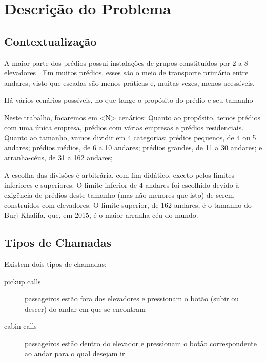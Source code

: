 \chapter{\label{chap:problem}Descrição do Problema}

\section{Contextualização}

A maior parte dos prédios possui instalações de grupos constituídos por 2 a 8
elevadores \cite{KOEHLEROTTIGER02}. Em muitos prédios, esses são o meio de
transporte primário entre andares, visto que escadas são menos práticas e,
muitas vezes, menos acessíveis. %

Há vários cenários possíveis, no que tange o propósito do prédio e seu tamanho

Neste trabalho, focaremos em <N> cenários: Quanto ao propósito, temos prédios
com uma única empresa, prédios com várias empresas e prédios residenciais.
Quanto ao tamanho, vamos dividir em 4 categorias: prédios pequenos, de 4 ou 5
andares; prédios médios, de 6 a 10 andares; prédios grandes, de 11 a 30 andares;
e arranha-céus, de 31 a 162 andares;



A escolha das divisões é arbitrária, com fim didático, exceto pelos limites
inferiores e superiores. O limite inferior de 4 andares foi escolhido devido à
exigência de prédios deste tamanho (mas não menores que isto) de serem
construídos com elevadores. O limite superior, de 162 andares, é o tamanho do
Burj Khalifa, que, em 2015, é o maior arranha-céu do mundo.

\section{Tipos de Chamadas}

Existem dois tipos de chamadas:

\begin{description}
\item[pickup calls] passageiros estão fora dos elevadores e pressionam o botão (subir ou descer) do andar em que se encontram
\item[cabin calls] passageiros estão dentro do elevador e pressionam o botão correspondente ao andar para o qual desejam ir
\end{description}

